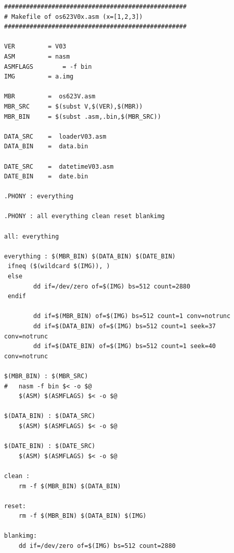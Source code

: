 \documentclass{article}
\begin{document}
    \begin{lstlisting}[caption={Makefile listing}, captionpos=t]
        ##################################################
# Makefile of os623V0x.asm (x=[1,2,3])
##################################################

VER			= V03
ASM			= nasm
ASMFLAGS		= -f bin
IMG			= a.img

MBR			=  os623V.asm
MBR_SRC		= $(subst V,$(VER),$(MBR))
MBR_BIN		= $(subst .asm,.bin,$(MBR_SRC))

DATA_SRC	=  loaderV03.asm
DATA_BIN	=  data.bin

DATE_SRC	=  datetimeV03.asm
DATE_BIN	=  date.bin

.PHONY : everything

.PHONY : all everything clean reset blankimg

all: everything

everything : $(MBR_BIN) $(DATA_BIN) $(DATE_BIN)
 ifneq ($(wildcard $(IMG)), )
 else
		dd if=/dev/zero of=$(IMG) bs=512 count=2880
 endif

		dd if=$(MBR_BIN) of=$(IMG) bs=512 count=1 conv=notrunc
		dd if=$(DATA_BIN) of=$(IMG) bs=512 count=1 seek=37 conv=notrunc
		dd if=$(DATE_BIN) of=$(IMG) bs=512 count=1 seek=40 conv=notrunc

$(MBR_BIN) : $(MBR_SRC)
#	nasm -f bin $< -o $@
	$(ASM) $(ASMFLAGS) $< -o $@

$(DATA_BIN) : $(DATA_SRC)
	$(ASM) $(ASMFLAGS) $< -o $@

$(DATE_BIN) : $(DATE_SRC)
	$(ASM) $(ASMFLAGS) $< -o $@

clean :
	rm -f $(MBR_BIN) $(DATA_BIN)

reset:
	rm -f $(MBR_BIN) $(DATA_BIN) $(IMG)

blankimg:
	dd if=/dev/zero of=$(IMG) bs=512 count=2880
    \end{lstlisting}
\end{document}
